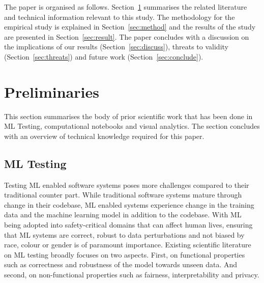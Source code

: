 \documentclass[acmsmall,screen,review,anonymous]{acmart}
\begin{document}

The paper is organised as follows. Section~\ref{sec:prelim} summarises the related literature and technical information relevant to this study. The methodology for the empirical study is explained in Section~\ref{sec:method} and the results of the study are presented in Section~\ref{sec:result}. The paper concludes with a discussion on the implications of our results (Section~\ref{sec:discuss}), threats to validity (Section~\ref{sec:threats}) and future work (Section~\ref{sec:conclude}).

\section{Preliminaries}\label{sec:prelim}


This section summarises the body of prior scientific work that has been done in ML Testing, computational notebooks and visual analytics. The section concludes with an overview of technical knowledge required for this paper.

\subsection{ML Testing}\label{sec:ml-testing}

Testing ML enabled software systems poses more challenges compared to their traditional counter part. While traditional software systems mature through change in their codebase, ML enabled systems experience change in the training data and the machine learning model in addition to the codebase\cite{CITEME}. With ML being adopted into safety-critical domains that can affect human lives, ensuring that ML systems are correct, robust to data perturbations and not biased by race, colour or gender is of paramount importance. Existing scientific literature on ML testing broadly focuses on two aspects. First, on functional properties such as correctness and robustness of the model towards unseen data. And second, on non-functional properties such as fairness, interpretability and privacy.
\end{document}
